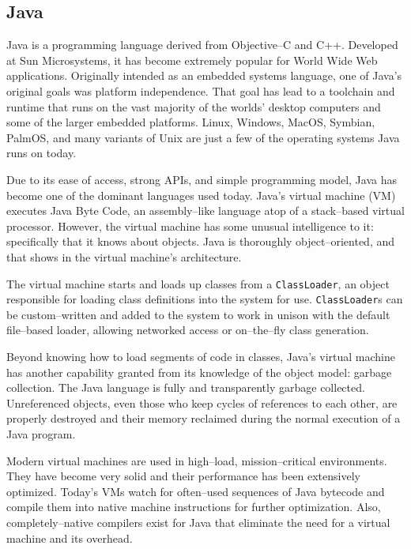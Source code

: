 \subsection{Java}

Java\cite{java} is a programming language derived from Objective--C and C++.
Developed at Sun Microsystems, it has become extremely popular for World Wide
Web applications. Originally intended as an embedded systems language, one of
Java's original goals was platform independence. That goal has lead to a
toolchain and runtime that runs on the vast majority of the worlds' desktop
computers and some of the larger embedded platforms. Linux, Windows, MacOS,
Symbian, PalmOS, and many variants of Unix are just a few of the operating
systems Java runs on today.

Due to its ease of access, strong APIs, and simple programming model, Java has
become one of the dominant languages used today. Java's virtual machine (VM)
executes Java Byte Code, an assembly--like language atop of a stack--based
virtual processor. However, the virtual machine has some unusual intelligence
to it: specifically that it knows about objects. Java is thoroughly
object--oriented, and that shows in the virtual machine's architecture.

The virtual machine starts and loads up classes from a \texttt{ClassLoader},
an object responsible for loading class definitions into the system for use.
\texttt{ClassLoader}s can be custom--written and added to the system to work
in unison with the default file--based loader, allowing networked access or
on--the--fly class generation\cite{javassist}.

Beyond knowing how to load segments of code in classes, Java's virtual machine
has another capability granted from its knowledge of the object model: garbage
collection. The Java language is fully and transparently garbage collected.
Unreferenced objects, even those who keep cycles of references to each other,
are properly destroyed and their memory reclaimed during the normal execution
of a Java program.

Modern virtual machines are used in high--load, mission--critical
environments. They have become very solid and their performance has been
extensively optimized. Today's VMs watch for often--used sequences of Java
bytecode and compile them into native machine instructions for further
optimization. Also, completely--native compilers exist for Java\cite{GCJ} that
eliminate the need for a virtual machine and its overhead.

